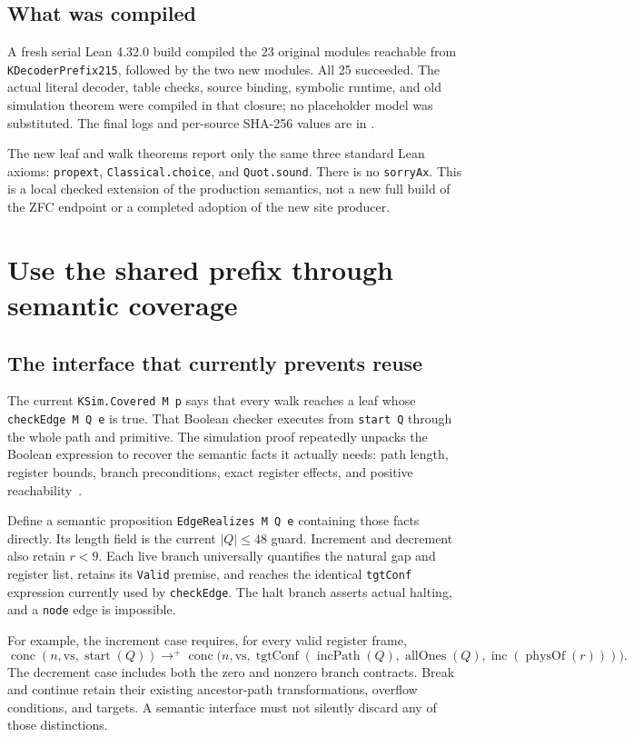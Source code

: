 \documentclass[11pt,letterpaper]{article}
\newcommand{\code}[1]{\texttt{\small #1}}
\newcommand{\Reachp}{\mathrel{\longrightarrow^{+}}}
\begin{document}
\subsection{What was compiled}

A fresh serial Lean 4.32.0 build compiled the 23 original modules reachable from
\code{KDecoderPrefix215}, followed by the two new modules. All 25 succeeded. The
actual literal decoder, table checks, source binding, symbolic runtime, and old
simulation theorem were compiled in that closure; no placeholder model was substituted.
The final logs and per-source SHA-256 values are in .

The new leaf and walk theorems report only the same three standard Lean axioms:
\code{propext}, \code{Classical.choice}, and \code{Quot.sound}. There is no
\code{sorryAx}. This is a local checked extension of the production semantics, not
a new full build of the ZFC endpoint or a completed adoption of the new site producer.

\section{Use the shared prefix through semantic coverage}
\label{sec:semantic}

\subsection{The interface that currently prevents reuse}

The current \code{KSim.Covered M p} says that every walk reaches a leaf whose
\code{checkEdge M Q e} is true. That Boolean checker executes from
\code{start Q} through the whole path and primitive. The simulation proof repeatedly
unpacks the Boolean expression to recover the semantic facts it actually needs:
path length, register bounds, branch preconditions, exact register effects, and
positive reachability~\cite{sim}.

Define a semantic proposition \code{EdgeRealizes M Q e} containing those facts
directly. Its length field is the current \(|Q|\le48\) guard. Increment and decrement
also retain \(r<9\). Each live branch universally quantifies the natural gap and
register list, retains its \code{Valid} premise, and reaches the identical
\code{tgtConf} expression currently used by \code{checkEdge}. The halt branch asserts
actual halting, and a \code{node} edge is impossible.

For example, the increment case requires, for every valid register frame,
\[
 \operatorname{conc}(n,\mathrm{vs},\operatorname{start}(Q))
 \Reachp
 \operatorname{conc}\bigl(n,\mathrm{vs},
  \operatorname{tgtConf}(\operatorname{incPath}(Q),\operatorname{allOnes}(Q),
       \operatorname{inc}(\operatorname{physOf}(r)))\bigr).
\]
The decrement case includes both the zero and nonzero branch contracts. Break and
continue retain their existing ancestor-path transformations, overflow conditions,
and targets. A semantic interface must not silently discard any of those distinctions.
\end{document}
